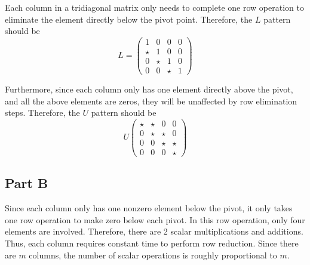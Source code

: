 \documentclass{article}
\begin{document}
Each column in a tridiagonal matrix only needs to complete one row operation to
eliminate the element directly below the pivot point. Therefore, the $ L $
pattern should be
\[
    L = \begin{pmatrix}
        1 & 0 & 0 & 0 \\
        \star & 1 & 0 & 0 \\
        0 & \star & 1 & 0 \\
        0 & 0 & \star & 1
    \end{pmatrix}
\]

Furthermore, since each column only has one element directly above the pivot,
and all the above elements are zeros, they will be unaffected by row elimination
steps. Therefore, the $ U $ pattern should be
\[
    U \begin{pmatrix}
        \star & \star & 0 & 0 \\
        0 & \star & \star & 0 \\
        0 & 0 & \star & \star \\
        0 & 0 & 0 & \star
    \end{pmatrix}
\]

\subsection*{Part B}

Since each column only has one nonzero element below the pivot, it only takes
one row operation to make zero below each pivot. In this row operation, only
four elements are involved. Therefore, there are 2 scalar multiplications and
additions. Thus, each column requires constant time to perform row reduction.
Since there are $ m $ columns, the number of scalar operations is roughly
proportional to $ m $.
\end{document}
